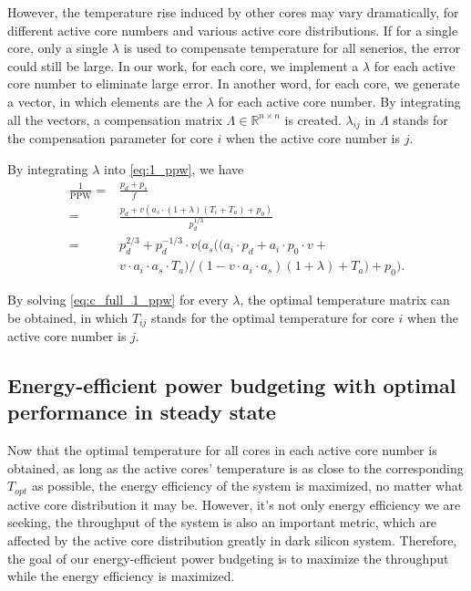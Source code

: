 However, the temperature rise induced by other cores may vary dramatically, for different active core numbers and various active core distributions. If for a single core, only a single $\lambda$ is used to compensate temperature for all senerios, the error could still be large. In our work, for each core, we implement a $\lambda$ for each active core number to eliminate large error. In another word, for each core, we generate a vector, in which elements are the $\lambda$ for each active core number. By integrating all the vectors, a compensation matrix $\Lambda \in \mathbb{R}^{n \times n}$ is created. $\lambda_{ij}$ in $\Lambda$ stands for the compensation parameter for core $i$ when the active core number is $j$.


By integrating $\lambda$ into \eqref{eq:1_ppw}, we have
\begin{equation}\label{eq:c_full_1_ppw}
\begin{split}
\frac{1}{\text{PPW}}=&\frac{p_{d}+p_{s}}{f}\\
=&\frac{p_{d}+v(a_{s} \cdot (1+\lambda)(T_{i}+T_{a})+p_{0})}{p_{d}^{1/3}}\\
=&p_{d}^{2/3}+p_{d}^{-1/3}\cdot v(a_{s} ((a_{i} \cdot p_{d}+a_{i} \cdot p_{0} \cdot v+\\
&v \cdot a_{i} \cdot a_{s} \cdot T_{a})/(1-v \cdot a_{i} \cdot a_{s})(1+\lambda)+T_{a})+p_{0}).
\end{split}
\end{equation}

By solving \eqref{eq:c_full_1_ppw} for every $\lambda$, the optimal temperature matrix can be obtained, in which $T_{ij}$ stands for the optimal temperature for core $i$ when the active core number is $j$.

\subsection{Energy-efficient power budgeting with optimal performance in steady state}
Now that the optimal temperature for all cores in each active core number is obtained, as long as the active cores' temperature is as close to the corresponding $T_{opt}$ as possible, the energy efficiency of the system is maximized, no matter what active core distribution it may be. However, it's not only energy efficiency we are seeking, the throughput of the system is also an important metric, which are affected by the active core distribution greatly in dark silicon system. Therefore, the goal of our energy-efficient power budgeting is to maximize the throughput while the energy efficiency is maximized.

